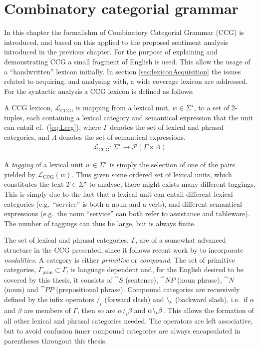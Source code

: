 
\chapter{Combinatory categorial grammar}
\label{chap:CCG}

In this chapter the formalishm of Combinatory Categorial Grammar (CCG) is introduced, and  based on this applied to the proposed sentiment analysis introduced in the previous chapter. For the purpose of explaining and demonstrating CCG a small fragment of English is used. This allow the usage of a ``handwritten'' lexicon initially. In section \ref{sec:lexiconAcquisition} the issues related to acquiring, and analysing with, a wide coverage lexicon are addressed. For the syntactic analysis a CCG lexicon is defined as follows:

\begin{definition}
A CCG lexicon, $\mathcal{L}_\mathrm{CCG}$, is mapping from a lexical unit, $w \in \Sigma^\star$, to a set of 2-tuples, each containing a lexical category and semantical expression that the unit can entail cf.\ (\ref{eq:Lccg}), where $\Gamma$ denotes the set of lexical and phrasal categories, and $\Lambda$ denotes the set of semantical expressions.
\begin{align}
 \mathcal{L}_\mathrm{CCG}: \Sigma^\star \to \mathcal{P}(\Gamma \times \Lambda)
 \label{eq:Lccg}
\end{align}
\end{definition}

A \emph{tagging} of a lexical unit $w \in \Sigma^\star$ is simply the selection of one of the pairs yielded by $\mathcal{L}_\mathrm{CCG}(w)$. Thus given some ordered set of lexical units, which constitutes the text $T \in \Sigma^\star$ to analyse, there might exists many different taggings. This is simply due to the fact that a lexical unit can entail different lexical categories (e.g.\ ``service'' is both a noun and a verb), and different semantical expressions (e.g.\ the noun ``service'' can both refer to assistance and tableware). The number of taggings can thus be large, but is always finite.

The set of lexical and phrasal categories, $\Gamma$, are of a somewhat advanced structure in the CCG presented, since it follows recent work by \citeauthor{multiModalCCG}  to incorporate \emph{modalities}. A category is either \emph{primitive} or \emph{compound}. The set of primitive categories, $\Gamma_\mathrm{prim} \subset \Gamma$, is language dependent and, for the English desired to be covered by this thesis, it consists of $\cat{S}$ (sentence), $\cat{NP}$ (noun phrase), $\cat{N}$ (noun) and $\cat{PP}$ (prepositional phrase). Compound categories are recursively defined by the infix operators $/_\iota$ (forward slash) and $\backslash_\iota$ (backward slash), i.e.\ if $\alpha$ and $\beta$ are members of $\Gamma$, then so are $\alpha/_\iota\beta$ and $\alpha \backslash_\iota \beta$. This allows the formation of all other lexical and phrasal categories needed. The operators are left associative, but to avoid confusion inner compound categories are always encapsulated in parentheses througout this thesis.

